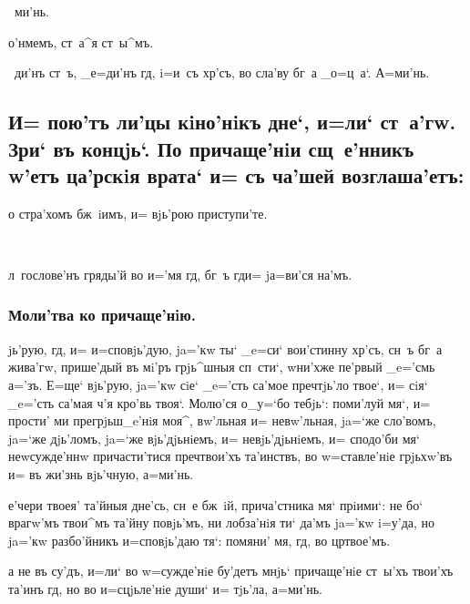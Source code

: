 \documentclass[12pt,twoside,a6paper,xdvi,civil=antiqua]{hipbook}
\newcommand{\lik}{\rem{Ли'къ:}\ }
\renewcommand{\*}{~~\raise3pt\hbox{\footnotesize*}}
\begin{document}
{{\lik{ми'нь.} 


о'нмемъ, ст~а^я ст~ы^мъ.

\lik{{\large{}ди'нъ ст~ъ, _е=ди'нъ гд, i=и~съ хр'съ, во сла'ву
    бг~а _о=ц~а`. А=ми'нь.}}

\subsection[Причаще'нiе мiря'нъ]{И= пою'тъ ли'цы кiно'нiкъ дне`, 
  и=ли` ст~а'гw. Зри` въ концjь`. По причаще'нiи сщ~е'нникъ w'етъ
  ца'рскiя врата` и= съ ча'шей возглаша'етъ:}

о стра'хомъ бж~iимъ, и= вjь'рою приступи'те.

\lik{{\large{}л~гослове'нъ гряды'й во и='мя гд, бг~ъ гд и=
    jа=ви'ся на'мъ.\par}}

\subsubsection{Моли'тва ко причаще'нiю.}

{\large{}jь'рую, гд, и= и=сповjь'дую, ja='кw ты` _e=си` во\-и'с\-тин\-ну
хр'съ, сн~ъ бг~а жива'гw, при\-ше'\-дый въ мi'ръ грjь^ш\-ныя
сп~сти`, w\т ни'х\-же пе'рвый _e='смь а='зъ. Е=ще` вjь'рую, ja='кw
сiе` _e='сть са'мое пре\-ч тjь'ло твое`, и= сiя` _e='сть са'\-мая
ч'я кро'вь твоя`. Мо\-лю'\-ся о_у=`бо тебjь`: поми'луй мя`, и=
прости' ми пре\-грjь\-ш_e'нiя моя^, вw'льная и= не\-вw'льная, ja=`же
сло'\-вомъ, ja=`же дjь'ломъ, ja=`же вjь'\-дjь\-нi\-емъ, и=
не\-вjь'\-дjь\-нi\-емъ, и= спо\-до'би мя` не\-w\-суж\-де'ннw
причасти'тися пре\-ч тво\-и'хъ та'\-инствъ, во w=ставле'нiе
грjь\-хw'въ и= въ жи'знь вjь'ч\-ную, а=ми'нь.

е'чери твоея' та'йныя дне'сь, сн~е бж~iй, при\-ча'ст\-ника мя`
прiими`: не бо` врагw'мъ тво\-и^мъ та'й\-ну повjь'мъ, ни лоб\-за'нiя
ти` да'мъ ja='кw i=у'\-да, но ja='кw разбо'йникъ и=спо\-вjь'\-даю
тя`: по\-мя\-ни' мя, гд, во цр тво\-е'мъ.

а не въ су'дъ, и=ли` во w=сужде'нiе бу'детъ мнjь` причаще'нiе ст~ы'хъ
тво\-и'хъ та'инъ гд, но во и=сцjьле'нiе души` и= тjь'ла, а=ми'нь.\par}


}}
\end{document}
